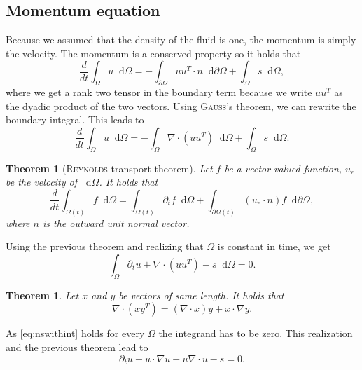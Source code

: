 \documentclass[12pt,a4paper,twoside, open=right]{scrreprt}
\theoremstyle{definition}
\theoremstyle{plain}
\newtheorem{sa}[auf]{Theorem}
\newcommand{\D}{\mathop{}\!\mathrm{d}}
\begin{document}
\subsection{Momentum equation}
Because we assumed that the density of the fluid is one, the momentum is simply the velocity. The momentum is a conserved property so it holds that
\begin{equation}
    \frac{d}{dt}\int_\Omega u\D\Omega = -\int_{\partial\Omega}uu^T\cdot n\D\partial\Omega +\int_\Omega s\D\Omega,
\end{equation} where we get a rank two tensor in the boundary term because we write $uu^T$ as the dyadic product of the two vectors. Using \textsc{Gauß}'s theorem, we can rewrite the boundary integral. This leads to 
\begin{equation}
    \frac{d}{dt}\int_\Omega u\D\Omega = -\int_\Omega \nabla\cdot(uu^T)\D\Omega +\int_\Omega s\D\Omega.
\end{equation}

\begin{sa}[\textsc{Reynolds} transport theorem]
    Let $f$ be a vector valued function, $u_e$ be the velocity of $\D\Omega$. It holds that
    \begin{equation}
        \frac{d}{dt}\int_{\Omega(t)}f\D \Omega =\int_{\Omega(t)}\partial_t f\D \Omega+\int_{\partial\Omega(t)}(u_e\cdot n)f\D \partial \Omega,
    \end{equation}
    where $n$ is the outward unit normal vector.
\end{sa}
Using the previous theorem and realizing that $\Omega$ is constant in time, we get
\begin{equation}\label{eq:nswithint}
    \int_\Omega \partial_t u +\nabla\cdot(uu^T)-s\D\Omega =0.
\end{equation}
\begin{sa}
    Let $x$ and $y$ be vectors of same length. It holds that
    \begin{equation}
    \nabla\cdot(xy^T)=(\nabla\cdot x)y+x\cdot\nabla y.
    \end{equation}
\end{sa}
As \eqref{eq:nswithint} holds for every $\Omega$ the integrand has to be zero. This realization and the previous theorem lead to 
\begin{equation}
    \partial_t u +u\cdot\nabla u+u\nabla\cdot u - s = 0.
\end{equation}
\end{document}
